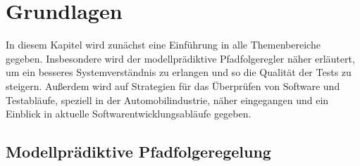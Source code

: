 \chapter{Grundlagen} \label{chap:Grundlagen}
\thispagestyle{empty}
In diesem Kapitel wird zunächst eine Einführung in alle Themenbereiche gegeben. Insbesondere wird der modellprädiktive Pfadfolgeregler näher erläutert, um ein besseres Systemverständnis zu erlangen und so die Qualität der Tests zu steigern. Außerdem wird auf  Strategien für das Überprüfen von Software und Testabläufe, speziell in der Automobilindustrie, näher eingegangen und ein Einblick in aktuelle Softwarentwicklungsabläufe gegeben. 
\section{Modellprädiktive Pfadfolgeregelung} \label{sec:MPFC}
